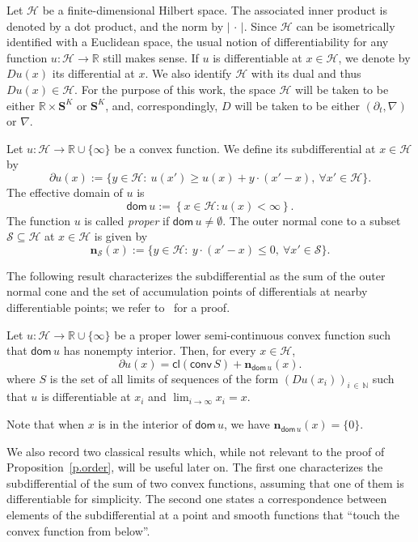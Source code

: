\documentclass[AHL,Unicode,longabstracts,published]{cedram}
\newcommand{\N}{\mathbb{N}}
\newcommand{\R}{\mathbb{R}}
\renewcommand{\S}{\mathbf{S}}
\newcommand{\bfn}{\mathbf{n}}
\newcommand{\dom}{\mathsf{dom}}
\newcommand{\cl}{\mathsf{cl}}
\newcommand{\conv}{\mathsf{conv}}
\newcommand{\scH}{\mathscr{H}}
\newcommand{\scS}{\mathscr{S}}
\renewcommand{\leq}{\leqslant}
\renewcommand{\geq}{\geqslant}
\renewcommand{\subset}{\subseteq}
\let\oldforall\forall
\renewcommand*{\forall}{\mathrel{\oldforall}}
\begin{document}
Let $\scH$ be a finite-dimensional Hilbert space. The associated inner product is denoted by a dot product, and the norm by $|\,\cdot\,|$. Since $\scH$ can be isometrically identified with a Euclidean space, the usual notion of differentiability for any function $u:\scH \to \R$ still makes sense. If $u$ is differentiable at $x\in \scH$, we denote by $Du(x)$ its differential at $x$. We also identify $\scH$ with its dual and thus $Du(x)\in \scH$. For the purpose of this work, the space $\scH$ will be taken to be either $\R\times \S^K$ or $\S^K$, and, correspondingly, $D$ will be taken to be either $(\partial_t,\nabla)$ or $\nabla$.

Let $u:\scH\to \R\cup\{\infty\}$ be a convex function. We define its subdifferential at $x\in\scH$ by
\begin{equation}\label{e.def.subdiff}
\partial u(x) := \Big\{y\in\scH:\ u(x')\geq u(x)+ y\cdot(x'-x),\ \forall x'\in\scH\Big\}.
\end{equation}
The effective domain of $u$ is
\[
\dom\, u := \left\{x \in \scH:u(x)<\infty\right\}.
\]
The function $u$ is called \emph{proper} if $\dom\, u\neq \emptyset$. The outer normal cone to a subset $\scS \subset \scH$ at $x\in\scH$ is given by
\begin{equation}\label{e.def_outer_normal}
\bfn_{\scS}(x) := \big\{y\in\scH:\ y\cdot\left(x'-x\right)\leq 0,\ \forall x'\in \scS\big\}.
\end{equation}


The following result characterizes the subdifferential as the sum of the outer normal cone and the set of accumulation points of differentials at nearby differentiable points; we refer to~\cite[Theorem~25.6]{rockafellar1970convex} for a proof.

\begin{lemm}\label{l.char_subd}
Let $u:\scH\to \R\cup\{\infty\}$ be a proper lower semi-continuous convex function such that $\dom\, u$ has nonempty interior. Then, for every $x \in \scH$,
\[
\partial u(x) = \cl(\conv\, S) + \bfn_{\dom\, u}(x).
\]
where $S$ is the set of all limits of sequences of the form $(Du(x_i))_{i\,\in\,\N}$ such that $u$ is differentiable at $x_i$ and $\lim_{i\to\infty}x_i = x$.
\end{lemm}

Note that when $x$ is in the interior of $\dom\,u$, we have $\bfn_{\dom\, u}(x)=\{0\}$.



We also record two classical results which, while not relevant to the proof of Proposition~\ref{p.order}, will be useful later on. The first one characterizes the subdifferential of the sum of two convex functions, assuming that one of them is differentiable for simplicity. The second one states a correspondence between elements of the subdifferential at a point and smooth functions that ``touch the convex function from below''.
\end{document}
